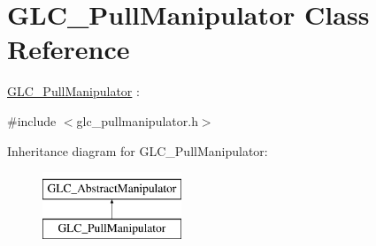 \hypertarget{class_g_l_c___pull_manipulator}{\section{G\-L\-C\-\_\-\-Pull\-Manipulator Class Reference}
\label{class_g_l_c___pull_manipulator}
}


\hyperlink{class_g_l_c___pull_manipulator}{G\-L\-C\-\_\-\-Pull\-Manipulator} \-:  




{\ttfamily \#include $<$glc\-\_\-pullmanipulator.\-h$>$}

Inheritance diagram for G\-L\-C\-\_\-\-Pull\-Manipulator\-:\begin{figure}[H]
\begin{center}
\leavevmode
\includegraphics[height=2.000000cm]{class_g_l_c___pull_manipulator}
\end{center}
\end{figure}
